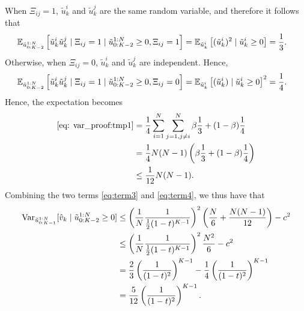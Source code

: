 When $\Xi_{ij}=1$, $\tilde{u}^i_k$ and $\tilde{u}^j_k$ are the same random variable, and therefore it follows that
\begin{align}
    \mathbb{E}_{\tilde{u}_{0:K-2}^{1:N}}\left[ \tilde{u}^i_k \tilde{u}^j_k \mid \Xi_{ij}=1 \mid \tilde{u}_{0:K-2}^{1:N} \geq 0, \Xi_{ij}=1 \right]
    &= \mathbb{E}_{\tilde{u}^i_k}\left[ (\tilde{u}^i_k)^2 \mid \tilde{u}^i_k \geq 0 \right] = \frac{1}{3}.
\end{align}
Otherwise, when $\Xi_{ij}=0$, $\tilde{u}^i_k$ and $\tilde{u}^j_k$ are independent. Hence,
\begin{align}
    \mathbb{E}_{\tilde{u}_{0:K-2}^{1:N}}\left[ \tilde{u}^i_k \tilde{u}^j_k \mid \Xi_{ij}=1 \mid \tilde{u}_{0:K-2}^{1:N} \geq 0, \Xi_{ij}=0 \right]
    &= \mathbb{E}_{\tilde{u}^i_k}\left[ (\tilde{u}^i_k) \mid \tilde{u}^i_k \geq 0 \right]^2 = \frac{1}{4}.
\end{align}
Hence, the expectation becomes
\begin{align}
    \eqref{eq: var_proof:tmp1}
    &= \frac{1}{4} \sum_{i=1}^N \sum_{j=1, j\not=i}^N
    \beta \frac{1}{3}
    + (1-\beta) \frac{1}{4} \\
    &= \frac{1}{4} N(N-1) \left( \beta \frac{1}{3} + (1-\beta) \frac{1}{4} \right) \\
    &\leq \frac{1}{12} N(N-1).\label{eq:term4}
\end{align}
Combining the two terms \eqref{eq:term3} and \eqref{eq:term4}, we thus have that
\begin{align}
    \operatorname{Var}_{\tilde{u}_{0:K-1}^{1:N}}[ \hat{v}_k \mid \tilde{u}_{0:K-2}^{1:N} \geq 0 ]
    &\leq \left( \frac{1}{N} \frac{1}{ \frac{1}{2} (1-t)^{K-1} } \right)^2
    \left( \frac{N}{6} + \frac{N(N-1)}{12} \right) - c^2\\
    &\leq \left( \frac{1}{N} \frac{1}{ \frac{1}{2} (1-t)^{K-1} } \right)^2
    \frac{N^2}{6} - c^2\\
    &= \frac{2}{3} \left( \frac{1}{ (1-t)^2} \right)^{K-1} - \frac{1}{4} \left( \frac{1}{ (1-t)^2} \right)^{K-1} \\
    &= \frac{5}{12} \left( \frac{1}{ (1-t)^2} \right)^{K-1}.
\end{align}

